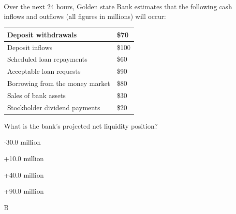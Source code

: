 \documentclass{article}
\newcounter{question} %
\begin{document}
\begin{question}
    Over the next 24 hours, Golden state Bank estimates that the following cash inflows and outflows (all figures in millions) will occur:

    \begin{table}[htbp]
        \centering
        \begin{tabular}{|l|l|}
            \hline
            Deposit withdrawals                & \$70  \\
            \hline
            Deposit inflows                    & \$100 \\
            \hline
            Scheduled loan repayments          & \$60  \\
            \hline
            Acceptable loan requests           & \$90  \\
            \hline
            Borrowing from the money market    & \$80  \\
            \hline
            Sales of bank assets               & \$30  \\
            \hline
            Stockholder dividend payments      & \$20  \\
            \hline
        \end{tabular}
    \end{table}
    What is the bank's projected net liquidity position?
\end{question}

\begin{choices}
    \item -30.0 million
    \item +10.0 million
    \item +40.0 million
    \item +90.0 million
\end{choices}

\begin{correctanswer}
    B
\end{correctanswer}
\end{document}
